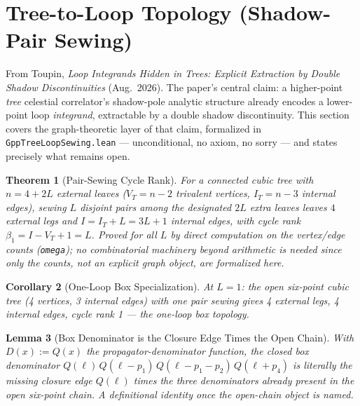 \documentclass{report}
\newtheorem{theorem}{Theorem}[chapter]
\newtheorem{lemma}[theorem]{Lemma}
\newtheorem{corollary}[theorem]{Corollary}
\theoremstyle{definition}
\begin{document}
\section{Tree-to-Loop Topology (Shadow-Pair Sewing)}
\label{sec:tree-loop-sewing}

From Toupin, \emph{Loop Integrands Hidden in Trees: Explicit Extraction by Double Shadow
Discontinuities} (Aug.\ 2026). The paper's central claim: a higher-point \emph{tree}
celestial correlator's shadow-pole analytic structure already encodes a lower-point loop
\emph{integrand}, extractable by a double shadow discontinuity. This section covers the
graph-theoretic layer of that claim, formalized in \texttt{GppTreeLoopSewing.lean} ---
unconditional, no axiom, no sorry --- and states precisely what remains open.

\begin{theorem}[Pair-Sewing Cycle Rank]
  \label{thm:pairsewing-cyclerank}
  \leanok
  For a connected cubic tree with $n = 4+2L$ external leaves ($V_T = n-2$ trivalent
  vertices, $I_T = n-3$ internal edges), sewing $L$ disjoint pairs among the designated
  $2L$ extra leaves leaves $4$ external legs and $I = I_T + L = 3L+1$ internal edges, with
  cycle rank $\beta_1 = I - V_T + 1 = L$. Proved for all $L$ by direct computation on the
  vertex/edge counts (\texttt{omega}); no combinatorial machinery beyond arithmetic is
  needed since only the counts, not an explicit graph object, are formalized here.
\end{theorem}

\begin{corollary}[One-Loop Box Specialization]
  \label{cor:sixpoint-oneloop}
  \leanok
  At $L=1$: the open six-point cubic tree (4 vertices, 3 internal edges) with one pair
  sewing gives 4 external legs, 4 internal edges, cycle rank 1 --- the one-loop box
  topology.
\end{corollary}

\begin{lemma}[Box Denominator is the Closure Edge Times the Open Chain]
  \label{lem:box-denominator-closure}
  \leanok
  With $D(x) := Q(x)$ the propagator-denominator function, the closed box denominator
  $Q(\ell)\,Q(\ell-p_1)\,Q(\ell-p_1-p_2)\,Q(\ell+p_4)$ is literally the missing closure
  edge $Q(\ell)$ times the three denominators already present in the open six-point
  chain. A definitional identity once the open-chain object is named.
\end{lemma}
\end{document}
